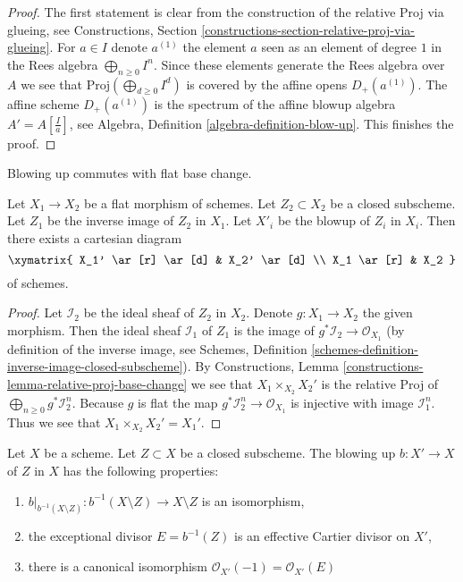\begin{proof}
The first statement is clear from the construction of the relative Proj via
glueing, see Constructions, Section
\ref{constructions-section-relative-proj-via-glueing}.
For $a \in I$ denote $a^{(1)}$ the element $a$ seen as an element of
degree $1$ in the Rees algebra $\bigoplus_{n \geq 0} I^n$.
Since these elements generate the Rees algebra over $A$ we see that
$\text{Proj}(\bigoplus_{d \geq 0} I^d)$ is covered by the affine opens
$D_{+}(a^{(1)})$. The affine scheme $D_{+}(a^{(1)})$ is the spectrum of
the affine blowup algebra $A' = A[\frac{I}{a}]$, see
Algebra, Definition \ref{algebra-definition-blow-up}.
This finishes the proof.
\end{proof}

\begin{lemma}
\label{lemma-flat-base-change-blowing-up}
\begin{slogan}
Blowing up commutes with flat base change.
\end{slogan}
Let $X_1 \to X_2$ be a flat morphism of schemes. Let $Z_2 \subset X_2$ be a
closed subscheme. Let $Z_1$ be the inverse image of $Z_2$ in $X_1$.
Let $X'_i$ be the blowup of $Z_i$ in $X_i$. Then there exists a cartesian
diagram
$$
\xymatrix{
X_1' \ar[r] \ar[d] & X_2' \ar[d] \\
X_1 \ar[r] & X_2
}
$$
of schemes.
\end{lemma}

\begin{proof}
Let $\mathcal{I}_2$ be the ideal sheaf of $Z_2$ in $X_2$.
Denote $g : X_1 \to X_2$ the given morphism. Then the ideal sheaf
$\mathcal{I}_1$ of $Z_1$ is the image of
$g^*\mathcal{I}_2 \to \mathcal{O}_{X_1}$
(by definition of the inverse image, see
Schemes, Definition \ref{schemes-definition-inverse-image-closed-subscheme}).
By Constructions, Lemma \ref{constructions-lemma-relative-proj-base-change}
we see that $X_1 \times_{X_2} X_2'$ is the relative Proj of
$\bigoplus_{n \geq 0} g^*\mathcal{I}_2^n$. Because $g$ is flat the map
$g^*\mathcal{I}_2^n \to \mathcal{O}_{X_1}$ is injective with image
$\mathcal{I}_1^n$. Thus we see that $X_1 \times_{X_2} X_2' = X_1'$.
\end{proof}

\begin{lemma}
\label{lemma-blowing-up-gives-effective-Cartier-divisor}
Let $X$ be a scheme. Let $Z \subset X$ be a closed subscheme.
The blowing up $b : X' \to X$ of $Z$ in $X$
has the following properties:
\begin{enumerate}
\item $b|_{b^{-1}(X \setminus Z)} : b^{-1}(X \setminus Z) \to X \setminus Z$
is an isomorphism,
\item the exceptional divisor $E = b^{-1}(Z)$ is an effective Cartier divisor
on $X'$,
\item there is a canonical isomorphism
$\mathcal{O}_{X'}(-1) = \mathcal{O}_{X'}(E)$
\end{enumerate}
\end{lemma}

